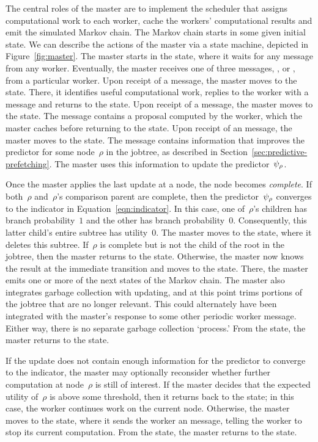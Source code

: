 \documentclass[angelino.tex]{subfiles}
\begin{document}
The central roles of the master are to implement the scheduler that assigns
computational work to each worker, cache the workers' computational results
and emit the simulated Markov chain.
%
The Markov chain starts in some given initial state.
%
We can describe the actions of the master via a state machine,
depicted in Figure~\ref{fig:master}.
%
The master starts in the \wait state, where it waits for any message
from any worker.
%
Eventually, the master receives one of three messages,
\WANTWORK, \SETPROPOSAL or \UPDATE, from a particular worker.
%
Upon receipt of a \WANTWORK message, the master moves to the \schedule state.
There, it identifies useful computational work, replies to the worker
with a \HAVEWORK message and returns to the \wait state.
%
Upon receipt of a \SETPROPOSAL message, the master moves to the \setproposal state.
The \SETPROPOSAL message contains a proposal computed by the worker,
which the master caches before returning to the \wait state.
%
Upon receipt of an \UPDATE message, the master moves to the \update state.
The \UPDATE message contains information that improves the predictor for some
node~$\rho$ in the jobtree, as described in Section~\ref{sec:predictive-prefetching}.
The master uses this information to update the predictor~$\psi_{\rho}$.

Once the master applies the last update at a node, the node becomes \emph{complete}.
If both~$\rho$ and~$\rho$'s comparison parent are complete, then the predictor~$\psi_{\rho}$
converges to the indicator in Equation~\ref{eqn:indicator}.
In this case, one of~$\rho$'s children has branch probability~$1$
and the other has branch probability~$0$.
Consequently, this latter child's entire subtree has utility~$0$.
The master moves to the \deleteloser state, where it deletes this subtree.
If~$\rho$ is complete but is not the child of the root in the jobtree,
then the master returns to the \wait state.
Otherwise, the master now knows the result at the immediate transition
and moves to the \emit state.
There, the master emits one or more of the next states of the Markov chain.
The master also integrates garbage collection with updating,
and at this point trims portions of the jobtree that are no longer relevant.
This could alternately have been integrated with the master's response to
some other periodic worker message.
Either way, there is no separate garbage collection `process.'
From the \emit state, the master returns to the \wait state.

If the update does not contain enough information for the predictor to
converge to the indicator, the master may optionally reconsider whether
further computation at node~$\rho$ is still of interest.
If the master decides that the expected utility of~$\rho$ is above some
threshold, then it returns back to the \wait state; in this case, the worker
continues work on the current node.
Otherwise, the master moves to the \sendabandon state, where it sends the
worker an \ABANDON message, telling the worker to stop its current computation.
From the \sendabandon state, the master returns to the \wait state.
\end{document}
